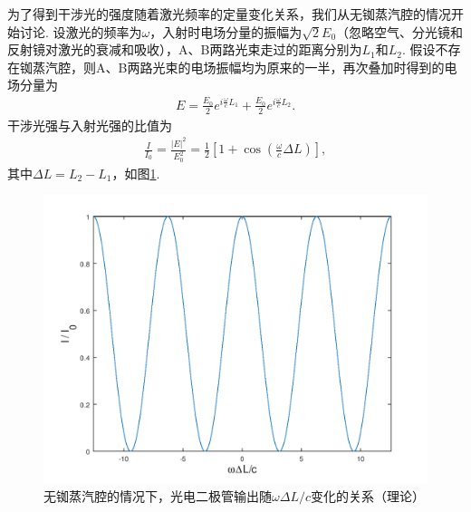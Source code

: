 \documentclass[a4paper, 10pt]{article}
\providecommand{\abs}[1]{\left\lvert#1\right\rvert} %
\begin{document}
\begin{multicols}{2}
为了得到干涉光的强度随着激光频率的定量变化关系，我们从无铷蒸汽腔的情况开始讨论. 设激光的频率为$\omega$，入射时电场分量的振幅为$\sqrt{2}E_0$（忽略空气、分光镜和反射镜对激光的衰减和吸收），A、B两路光束走过的距离分别为$L_1$和$L_2$. 假设不存在铷蒸汽腔，则A、B两路光束的电场振幅均为原来的一半，再次叠加时得到的电场分量为
\begin{align}
    E=\frac{E_0}{2}e^{i\frac{\omega}{c}L_1}+\frac{E_0}{2}e^{i\frac{\omega}{c}L_2}.
\end{align}
干涉光强与入射光强的比值为
\begin{align}
    \label{I/I_0-without-cell}
    \frac{I}{I_0}=\frac{\abs{E}^2}{E_0^2}=\frac{1}{2}\left[1+\cos\left(\frac{\omega}{c}\Delta L\right)\right],
\end{align}
其中$\Delta L=L_2-L_1$，如图\ref{OutputWithoutRbCell}.
\begin{figure}[H]
    \centering
    \includegraphics[width=.9\columnwidth]{OutputWithoutCell.png}
    \caption{无铷蒸汽腔的情况下，光电二极管输出随$\omega\Delta L/c$变化的关系（理论）}
        \label{OutputWithoutRbCell}
\end{figure}


\end{multicols}
\end{document}

